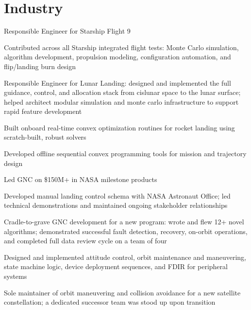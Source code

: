 \documentclass[]{deedy-resume-openfont}
\begin{document}
\begin{minipage}[t]{0.71\textwidth} 


\section{\Large{Industry}}

\vspace{\topsep}
\begin{tightemize}
\item Responsible Engineer for Starship Flight 9
\item Contributed across all Starship integrated flight tests: Monte Carlo simulation, algorithm development, propulsion modeling, configuration automation, and flip/landing burn design
\item Responsible Engineer for Lunar Landing: designed and implemented the full guidance, control, and allocation stack from cislunar space to the lunar surface; helped architect modular simulation  and monte carlo infrastructure to support rapid feature development
\item Built onboard real-time convex optimization routines for rocket landing using scratch-built, robust solvers
\item Developed offline sequential convex programming tools for mission and trajectory design
\item Led GNC on \$150M+ in NASA milestone products
\item Developed manual landing control schema with NASA Astronaut Office; led technical demonstrations and maintained ongoing stakeholder relationships
\end{tightemize}
\begin{tightemize}
\item Cradle-to-grave GNC development for a new program: wrote and flew 12+ novel algorithms; demonstrated successful fault detection, recovery, on-orbit operations, and completed full data review cycle on a team of four
\item Designed and implemented attitude control, orbit maintenance and maneuvering, state machine logic, device deployment sequences, and FDIR for peripheral systems
\item Sole maintainer of orbit maneuvering and collision avoidance for a new satellite constellation; a dedicated successor team was stood up upon transition
\end{tightemize}


\end{minipage}
\end{document}
